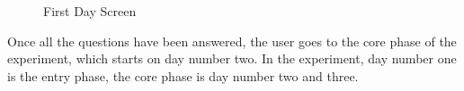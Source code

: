 \begin{figure}[htp]
  \hspace{3em}
  \caption{First Day Screen}
  \label{fig:first}
\end{figure}

Once all the questions have been answered, the user goes to the core phase of the experiment, which starts on day number two. In the experiment, day number one is the entry phase, the core phase is day number two and three.

